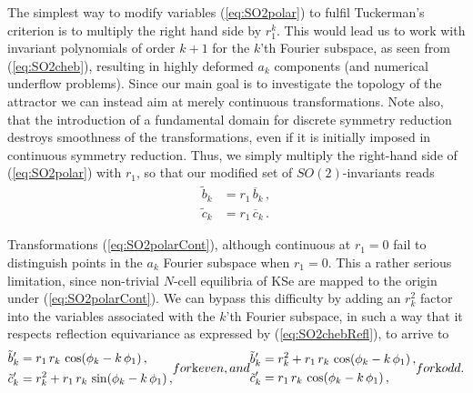 \documentclass[aip,cha,showpacs,twocolumn,
 		  reprint]{revtex4-1} %
\newcommand{\bseq}{\begin{subequations}}
\newcommand{\eseq}{\end{subequations}}
\newcommand{\refeq}  [1] {(\ref{#1})}
\begin{document}
The simplest way to modify variables \refeq{eq:SO2polar} to fulfil Tuckerman's
criterion is to multiply the right hand side by $r_1^k$. This would lead us to
work with invariant polynomials of order $k+1$ for the $k$'th Fourier subspace,
as seen from \refeq{eq:SO2cheb}, resulting in highly deformed $a_k$ components
(and numerical underflow problems). Since our main goal is to investigate the
topology of the attractor we can instead aim at merely continuous transformations.
Note also, that the introduction of a fundamental domain for discrete symmetry
reduction destroys smoothness of the transformations, even if it is initially
imposed in continuous symmetry reduction.
Thus, we simply multiply the right-hand side of \refeq{eq:SO2polar} with $r_1$,
so that our modified set of $SO(2)$-invariants reads
\bseq\label{eq:SO2polarCont}
  \begin{align}
    \tilde{b}_k &=
		    r_1\,\overline{b}_k\,, \label{eq:SO2polarCont1}\\
    \tilde{c}_k &=
		    r_1\,\overline{c}_k\,.\label{eq:SO2polarCont2}
  \end{align}
\eseq

Transformations \refeq{eq:SO2polarCont}, although continuous at
$r_1=0$ fail to distinguish points in the $a_k$ Fourier subspace when $r_1=0$.
This a rather serious limitation, since non-trivial $N$-cell equilibria of
KSe are mapped to the origin under \refeq{eq:SO2polarCont}.
We can bypass this difficulty by adding an $r_k^2$ factor into the variables
associated with the $k$'th Fourier subspace, in such a way that it respects
reflection equivariance as expressed by \refeq{eq:SO2chebRefl}, to arrive to
\bseq\label{eq:SO2inv}
  \begin{align}
    \tilde{b}'_k &=
		    r_1\,r_k\, \cos(\phi_k-k\,\phi_1)\,, \\
    \tilde{c}'_k &=
		    r_k^2+r_1\,r_k\,\sin(\phi_k-k\,\phi_1)\,,
  \end{align}
for $k$ even, and
  \begin{align}
    \tilde{b}'_k &=
		    r_k^2+r_1\,r_k\, \cos(\phi_k-k\,\phi_1)\,, \\
    \tilde{c}'_k &=
		    r_1\,r_k\, \cos(\phi_k-k\,\phi_1)\,,
  \end{align}
for $k$ odd.
\eseq
\end{document}
